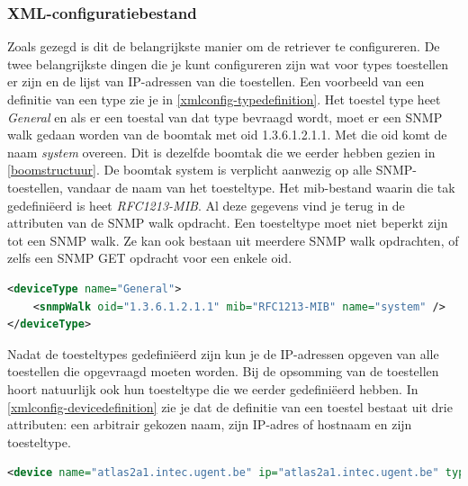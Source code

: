 
\subsubsection{XML-configuratiebestand}
Zoals gezegd is dit de belangrijkste manier om de retriever te configureren.
De twee belangrijkste dingen die je kunt configureren zijn wat voor types toestellen er zijn en de lijst van IP-adressen van die toestellen.
Een voorbeeld van een definitie van een type zie je in \cref{xmlconfig-typedefinition}.
Het toestel type heet \emph{General} en als er een toestal van dat type bevraagd wordt,
moet er een SNMP walk gedaan worden van de boomtak met \gls{oid} 1.3.6.1.2.1.1. Met die \gls{oid} komt de naam \emph{system} overeen.
Dit is dezelfde boomtak die we eerder hebben gezien in \cref{boomstructuur}.
De boomtak system is verplicht aanwezig op alle SNMP-toestellen, vandaar de naam van het toesteltype.
Het \gls{mib}-bestand waarin die tak gedefiniëerd is heet \emph{RFC1213-MIB}. Al deze gegevens vind je terug in de attributen van de SNMP walk opdracht.
Een toesteltype moet niet beperkt zijn tot een SNMP walk. Ze kan ook bestaan uit meerdere SNMP walk opdrachten,
of zelfs een SNMP GET opdracht voor een enkele \gls{oid}.

\begin{lstlisting}[language=XML, float=h, caption={Definitie van een toesteltype in het XML-configuratiebestand}, label=xmlconfig-typedefinition]
<deviceType name="General">
	<snmpWalk oid="1.3.6.1.2.1.1" mib="RFC1213-MIB" name="system" />
</deviceType>
\end{lstlisting}

Nadat de toesteltypes gedefiniëerd zijn kun je de IP-adressen opgeven van alle toestellen die opgevraagd moeten worden.
Bij de opsomming van de toestellen hoort natuurlijk ook hun toesteltype die we eerder gedefiniëerd hebben.
In \cref{xmlconfig-devicedefinition} zie je dat de definitie van een toestel bestaat uit drie attributen: een arbitrair gekozen naam, zijn IP-adres of hostnaam en zijn toesteltype. 

\begin{lstlisting}[language=XML, float=h, caption={Definitie van een toestel in het XML-configuratiebestand}, label=xmlconfig-devicedefinition]
<device name="atlas2a1.intec.ugent.be" ip="atlas2a1.intec.ugent.be" type="Bridge" />
\end{lstlisting}

